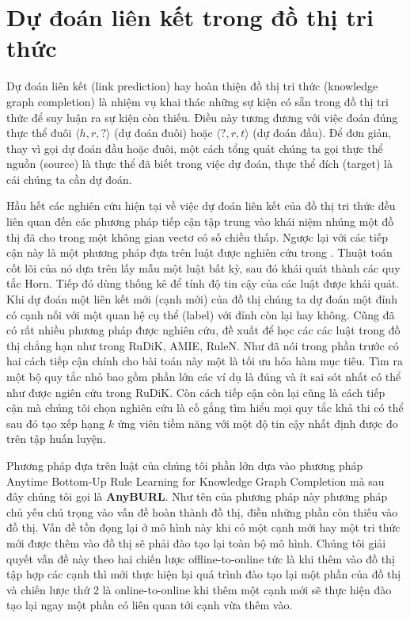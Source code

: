 \section{Dự đoán liên kết trong đồ thị tri thức}

Dự đoán liên kết (link prediction) hay hoàn thiện đồ thị tri thức (knowledge graph completion) là nhiệm vụ khai thác những sự kiện có sẵn trong đồ thị tri thức để suy luận ra sự kiện còn thiếu. Điều này tương đương với việc đoán đúng thực thể đuôi $\langle h, r, ? \rangle$ (dự đoán đuôi) hoặc $\langle ?, r, t \rangle$ (dự đoán đầu). Để đơn giản,  thay vì gọi dự đoán đầu hoặc đuôi, một cách tổng quát chúng ta gọi thực thể nguồn (source) là thực thể đã biết trong việc dự đoán, thực thể đích (target) là cái chúng ta cần dự đoán.


Hầu hết các nghiên cứu hiện tại về việc dự đoán liên kết của đồ thị tri thức đều liên quan đến các phương pháp tiếp cận tập trung vào khái niệm nhúng một đồ thị đã cho trong một không gian vectơ có số chiều thấp. Ngược lại với các tiếp cận này là một phương pháp đựa trên luật được nghiên cứu trong \cite{burl}. Thuật toán cốt lõi của nó dựa trên lấy mẫu một luật bất kỳ, sau đó khái quát  thành các quy tắc Horn\cite{wiki:Horn}. Tiếp đó dùng thống kê để tính độ tin cậy của các luật được khái quát. Khi dự đoán một liên kết mới (cạnh mới) của đồ thị chúng ta dự đoán một đỉnh có cạnh nối với một quan hệ cụ thể (label) với đỉnh còn lại hay không. Cũng đã có rất nhiều phương pháp được nghiên cứu, đề xuất để học các các luật trong đồ thị chẳng hạn như trong  RuDiK\cite{ortona2018robust}, AMIE\cite{galarraga2015fast}, RuleN\cite{meilicke2018fine}. 
Như đã nói trong phần trước có hai cách tiếp cận chính cho bài toán này một là tối ưu hóa hàm mục tiêu. Tìm ra một bộ quy tắc nhỏ bao gồm phần lớn các ví dụ là đúng và ít sai sót nhất có thể như được ngiên cứu trong RuDiK\cite{ortona2018robust}. Còn cách tiếp cận còn lại cũng là cách tiếp cận mà chúng tôi chọn nghiên cứu là cố gắng tìm hiểu mọi quy tắc khả thi có thể sau đó tạo xếp hạng \(k\) ứng viên tiềm năng với một độ tin cậy nhất định được đo trên tập huấn luyện.

Phương pháp đựa trên luật của chúng tôi phần lớn dựa vào phương pháp Anytime Bottom-Up Rule Learning for Knowledge Graph Completion \cite{meilicke2019anytime} mà sau đây chúng tôi gọi là \textbf{AnyBURL}. Như tên của phương pháp này phương pháp chủ yếu chú trọng vào vấn đề hoàn thành đồ thị, điền những phần còn thiếu vào đồ thị. Vấn đề tồn đọng lại ở mô hình này khi có một cạnh mới hay một tri thức mới được thêm vào đồ thị sẽ phải đào tạo lại toàn bộ mô hình. Chúng tôi giải quyết vẫn đề này theo hai chiến lược offline-to-online tức là khi thêm vào đồ thị tập hợp các cạnh thì mới thực hiện lại quá trình đào tạo lại một phần của đồ thị và chiến lược thứ 2 là online-to-online  khi thêm một cạnh mới sẽ thực hiện đào tạo lại ngay một phần có liên quan tới cạnh vừa thêm vào.


